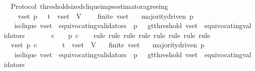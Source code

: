 \begin{isabellebody}
\isamarkupfalse%
%
\endisatagproof
{\isafoldproof}%
%
\isadelimproof
\isanewline
%
\endisadelimproof
\isanewline
\isanewline
{}\isamarkupfalse%
\ {\isacharparenleft}\ Protocol{\isacharparenright}\ threshold{\isacharunderscore}sized{\isacharunderscore}clique{\isacharunderscore}imps{\isacharunderscore}estimator{\isacharunderscore}agreeing\ {\isacharcolon}\isanewline
\ \ {\isachardoublequoteopen}{\isasymforall}\ {\isasymsigma}\ v{\isacharunderscore}set\ p{\isachardot}\ {\isasymsigma}\ {\isasymin}\ {\isasymSigma}t\ {\isasymand}\ v{\isacharunderscore}set\ {\isasymsubseteq}\ V\ \isanewline
\ \ {\isasymlongrightarrow}\ finite\ v{\isacharunderscore}set\isanewline
\ \ {\isasymlongrightarrow}\ majority{\isacharunderscore}driven\ p\isanewline
\ \ {\isasymlongrightarrow}\ is{\isacharunderscore}clique\ {\isacharparenleft}v{\isacharunderscore}set\ {\isacharminus}\ equivocating{\isacharunderscore}validators\ {\isasymsigma}{\isacharcomma}\ p{\isacharcomma}\ {\isasymsigma}{\isacharparenright}\ {\isasymand}\ gt{\isacharunderscore}threshold\ {\isacharparenleft}v{\isacharunderscore}set\ {\isacharminus}\ equivocating{\isacharunderscore}validators\ {\isasymsigma}{\isacharcomma}\ {\isasymsigma}{\isacharparenright}\ \isanewline
\ \ {\isasymlongrightarrow}\ {\isacharparenleft}{\isasymforall}\ c\ {\isasymin}\ {\isasymepsilon}\ {\isasymsigma}{\isachardot}\ p\ c{\isacharparenright}{\isachardoublequoteclose}\isanewline
%
\isadelimproof
\ \ %
\endisadelimproof
%
\isatagproof
{}\isamarkupfalse%
\ {\isacharparenleft}rule{\isacharcomma}\ rule{\isacharcomma}\ rule{\isacharcomma}\ rule{\isacharcomma}\ rule{\isacharcomma}\ rule{\isacharcomma}\ rule{\isacharcomma}\ rule{\isacharparenright}\isanewline
{}\isamarkupfalse%
\ {\isacharminus}\isanewline
\ \ \isamarkupfalse%
\ {\isasymsigma}\ v{\isacharunderscore}set\ p\ c\isanewline
\ \ \isamarkupfalse%
\ \ {\isachardoublequoteopen}{\isasymsigma}\ {\isasymin}\ {\isasymSigma}t\ {\isasymand}\ v{\isacharunderscore}set\ {\isasymsubseteq}\ V{\isachardoublequoteclose}\isanewline
\ \ \ {\isachardoublequoteopen}finite\ v{\isacharunderscore}set{\isachardoublequoteclose}\isanewline
\ \ \ {\isachardoublequoteopen}majority{\isacharunderscore}driven\ p{\isachardoublequoteclose}\isanewline
\ \ \ {\isachardoublequoteopen}is{\isacharunderscore}clique\ {\isacharparenleft}v{\isacharunderscore}set\ {\isacharminus}\ equivocating{\isacharunderscore}validators\ {\isasymsigma}{\isacharcomma}\ p{\isacharcomma}\ {\isasymsigma}{\isacharparenright}\ {\isasymand}\ gt{\isacharunderscore}threshold\ {\isacharparenleft}v{\isacharunderscore}set\ {\isacharminus}\ equivocating{\isacharunderscore}validators\ {\isasymsigma}{\isacharcomma}\ {\isasymsigma}{\isacharparenright}{\isachardoublequoteclose}\isanewline

\end{isabellebody}
